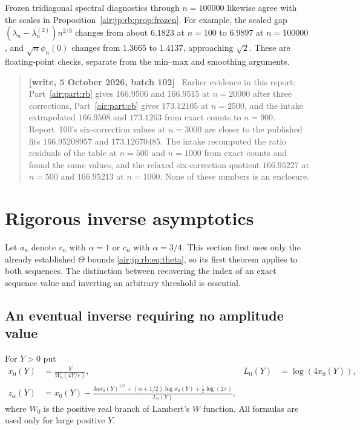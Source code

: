 \documentclass[11pt,letterpaper]{article}
\numberwithin{equation}{section}
\theoremstyle{remark}
\newenvironment{writenotejp}{\par\smallskip\begin{quote}\small\textbf{[write, 5 October 2026, batch 102]}\ }{\end{quote}\smallskip}
\begin{document}
Frozen tridiagonal spectral diagnostics through $n=100000$ likewise agree with the scales in Proposition~\ref{air:jp:rb:prop:frozen}. For example, the scaled gap $(\lambda_n-\lambda_n^{(2)})n^{2/3}$ changes from about $6.1823$ at $n=100$ to $6.9897$ at $n=100000$, and $\sqrt n\phi_n(0)$ changes from $1.3665$ to $1.4137$, approaching $\sqrt2$. These are floating-point checks, separate from the min--max and smoothing arguments.
\begin{writenotejp}
Earlier evidence in this report: Part~\ref{air:part:rb} gives $166.9506$ and $166.9515$ at $n=20000$ after three corrections, Part~\ref{air:part:cb} gives $173.12105$ at $n=2500$, and the intake extrapolated $166.9508$ and $173.1263$ from exact counts to $n=900$. Report~100's six-correction values at $n=3000$ are closer to the published fits $166.95208957$ and $173.12670485$. The intake recomputed the ratio residuals of the table at $n=500$ and $n=1000$ from exact counts and found the same values, and the relaxed six-correction quotient $166.95227$ at $n=500$ and $166.95213$ at $n=1000$. None of these numbers is an enclosure.
\end{writenotejp}

\section{Rigorous inverse asymptotics}\label{air:jp:rb:sec:inverse}

Let $a_n$ denote $r_n$ with $\alpha=1$ or $c_n$ with $\alpha=3/4$. This section first uses only the already established $\Theta$ bounds \eqref{air:jp:rb:eq:theta}, so its first theorem applies to both sequences. The distinction between recovering the index of an exact sequence value and inverting an arbitrary threshold is essential.

\subsection{An eventual inverse requiring no amplitude value}
For $Y>0$ put
\begin{align}
 x_0(Y)&=\frac{Y}{W_0(4Y/e)},&L_0(Y)&=\log(4x_0(Y)),\label{air:jp:rb:eq:lambert}\\
 z_\alpha(Y)&=x_0(Y)-
 \frac{3ax_0(Y)^{1/3}+(\alpha+1/2)\log x_0(Y)+\tfrac12\log(2\pi)}{L_0(Y)},\label{air:jp:rb:eq:inversez}
\end{align}
where $W_0$ is the positive real branch of Lambert's $W$ function. All formulas are used only for large positive $Y$.
\end{document}
